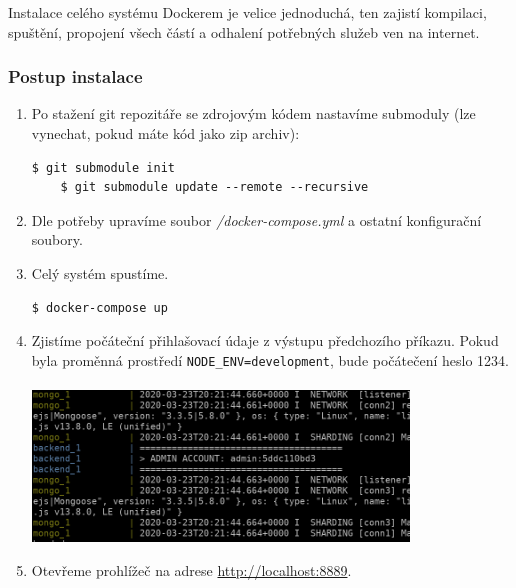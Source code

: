 \noindent
Instalace celého systému Dockerem je velice jednoduchá, ten zajistí kompilaci,
spuštění, propojení všech částí a odhalení potřebných služeb ven na internet. \citep[viz][]{DockerDocs}


\subsubsection*{Postup instalace}

\begin{enumerate}
  \setlength\itemsep{.05em}
  \item Po stažení git repozitáře se zdrojovým kódem nastavíme submoduly (lze vynechat, pokud máte kód jako zip archiv):\\
  \begin{lstlisting}[numbers=none]
    $ git submodule init
    $ git submodule update --remote --recursive
  \end{lstlisting}
  \item Dle potřeby upravíme soubor \textit{/docker-compose.yml} a ostatní konfigurační soubory.
  \item Celý systém spustíme.\\
  \begin{lstlisting}[numbers=none]
    $ docker-compose up
  \end{lstlisting}
  \item Zjistíme počáteční přihlašovací údaje z výstupu předchozího příkazu. Pokud byla proměnná prostředí \texttt{NODE\_ENV=development},
  bude počátečení heslo 1234.\\\\
  \includegraphics[width=100mm]{../img/installation_pass.png}\\
  \item Otevřeme prohlížeč na adrese \url{http://localhost:8889}.
\end{enumerate}

